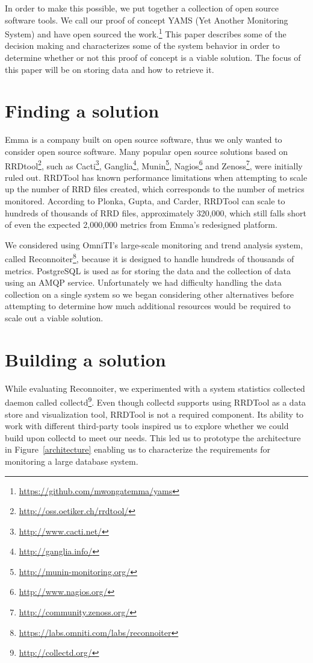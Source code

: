 \documentclass[twocolumn,letterpaper]{article}
\begin{document}
In order to make this possible, we put together a collection of open source
software tools.  We call our proof of concept YAMS (Yet Another
Monitoring System) and have open sourced the
work.\footnote{\url{https://github.com/mwongatemma/yams}}  This paper describes
some of the decision making and characterizes some of the system behavior in
order to determine whether or not this proof of concept is a viable solution.
The focus of this paper will be on storing data and how to retrieve it.

\section{Finding a solution}

Emma is a company built on open source software, thus we only wanted to
consider open source software.  Many popular open source solutions based on
RRDtool\footnote{\url{http://oss.oetiker.ch/rrdtool/}}, such as
Cacti\footnote{\url{http://www.cacti.net/}},
Ganglia\footnote{\url{http://ganglia.info/}},
Munin\footnote{\url{http://munin-monitoring.org/}},
Nagios\footnote{\url{http://www.nagios.org/}} and
Zenoss\footnote{\url{http://community.zenoss.org/}}, were initially ruled out.
RRDTool has known performance limitations when attempting to scale up the
number of RRD files created, which corresponds to the number of metrics
monitored.\cite{Plonka07}  According to Plonka, Gupta, and Carder, RRDTool can
scale to hundreds of thousands of RRD files, approximately 320,000, which still
falls short of even the expected 2,000,000 metrics from Emma's redesigned
platform.

We considered using OmniTI's large-scale monitoring and trend analysis system,
called Reconnoiter\footnote{\url{https://labs.omniti.com/labs/reconnoiter}},
because it is designed to handle hundreds of thousands of metrics.  PostgreSQL
is used as for storing the data and the collection of data using an AMQP
service.  Unfortunately we had difficulty handling the data collection on a
single system so we began considering other alternatives before attempting to
determine how much additional resources would be required to scale out a viable
solution.

\section{Building a solution}

While evaluating Reconnoiter, we experimented with a system statistics
collected daemon called collectd\footnote{\url{http://collectd.org/}}.  Even
though collectd supports using RRDTool as a data store and visualization tool,
RRDTool is not a required component.  Its ability to work with different
third-party tools inspired us to explore whether we could build upon collectd
to meet our needs.  This led us to prototype the architecture in
Figure~\ref{architecture} enabling us to characterize the requirements for
monitoring a large database system.
\end{document}

